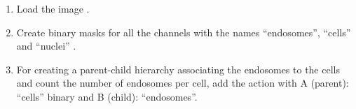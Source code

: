 \begin{enumerate}
    \item Load the image .

    \item Create binary masks for all the channels with the names ``endosomes'', ``cells'' and ``nuclei'' 
    . 

    \item For creating a parent-child hierarchy associating the endosomes to the cells and count the number of endosomes per cell, add the action  with A (parent): ``cells'' binary and B (child): ``endosomes''. 




\end{enumerate}
